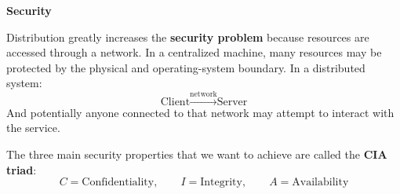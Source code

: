 \newpage

\begin{flushleft}
    \textcolor{Red2}{ \textbf{Security}}
\end{flushleft}
Distribution greatly increases the \textbf{security problem} because resources are accessed through a network.
In a centralized machine, many resources may be protected by the physical and operating-system boundary.
In a distributed system:
\begin{equation*}
    \text{Client}
    \xrightarrow{\text{network}}
    \text{Server}
\end{equation*}
And potentially anyone connected to that network may attempt to interact with the service.

\highspace
The three main security properties that we want to achieve are called the \textbf{CIA triad}:
\begin{equation*}
    C = \text{Confidentiality},\qquad
    I = \text{Integrity},\qquad
    A = \text{Availability}
\end{equation*}

